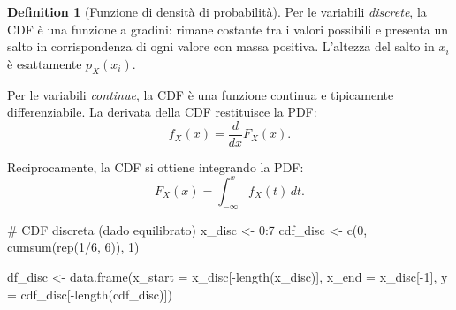 \documentclass[
  letterpaper,
  DIV=11,
  numbers=noendperiod,
  oneside]{scrreprt}
\newenvironment{Shaded}{\begin{snugshade}}{\end{snugshade}}
\newcommand{\AttributeTok}[1]{\textcolor[rgb]{0.40,0.45,0.13}{#1}}
\newcommand{\CommentTok}[1]{\textcolor[rgb]{0.37,0.37,0.37}{#1}}
\newcommand{\DecValTok}[1]{\textcolor[rgb]{0.68,0.00,0.00}{#1}}
\newcommand{\FunctionTok}[1]{\textcolor[rgb]{0.28,0.35,0.67}{#1}}
\newcommand{\NormalTok}[1]{\textcolor[rgb]{0.00,0.23,0.31}{#1}}
\newcommand{\OtherTok}[1]{\textcolor[rgb]{0.00,0.23,0.31}{#1}}
\newcommand{\SpecialCharTok}[1]{\textcolor[rgb]{0.37,0.37,0.37}{#1}}
\theoremstyle{definition}
\theoremstyle{plain}
\theoremstyle{definition}
\newtheorem{definition}{Definition}[chapter]
\theoremstyle{remark}
\begin{document}
\begin{definition}[Funzione di densità di
probabilità]
Per le variabili \emph{discrete}, la CDF è una funzione a gradini:
rimane costante tra i valori possibili e presenta un salto in
corrispondenza di ogni valore con massa positiva. L'altezza del salto in
\(x_i\) è esattamente \(p_X(x_i)\).

Per le variabili \emph{continue}, la CDF è una funzione continua e
tipicamente differenziabile. La derivata della CDF restituisce la PDF:
\[
f_X(x) = \frac{d}{dx} F_X(x).
\]

Reciprocamente, la CDF si ottiene integrando la PDF: \[
F_X(x) = \int_{-\infty}^{x} f_X(t) \, dt.
\]

\begin{Shaded}
\begin{Highlighting}[]
\CommentTok{\# CDF discreta (dado equilibrato)}
\NormalTok{x\_disc }\OtherTok{\textless{}{-}} \DecValTok{0}\SpecialCharTok{:}\DecValTok{7}
\NormalTok{cdf\_disc }\OtherTok{\textless{}{-}} \FunctionTok{c}\NormalTok{(}\DecValTok{0}\NormalTok{, }\FunctionTok{cumsum}\NormalTok{(}\FunctionTok{rep}\NormalTok{(}\DecValTok{1}\SpecialCharTok{/}\DecValTok{6}\NormalTok{, }\DecValTok{6}\NormalTok{)), }\DecValTok{1}\NormalTok{)}

\NormalTok{df\_disc }\OtherTok{\textless{}{-}} \FunctionTok{data.frame}\NormalTok{(}\AttributeTok{x\_start =}\NormalTok{ x\_disc[}\SpecialCharTok{{-}}\FunctionTok{length}\NormalTok{(x\_disc)], }
                      \AttributeTok{x\_end =}\NormalTok{ x\_disc[}\SpecialCharTok{{-}}\DecValTok{1}\NormalTok{], }
                      \AttributeTok{y =}\NormalTok{ cdf\_disc[}\SpecialCharTok{{-}}\FunctionTok{length}\NormalTok{(cdf\_disc)])}


\end{Highlighting}
\end{Shaded}
\end{definition}
\end{document}

